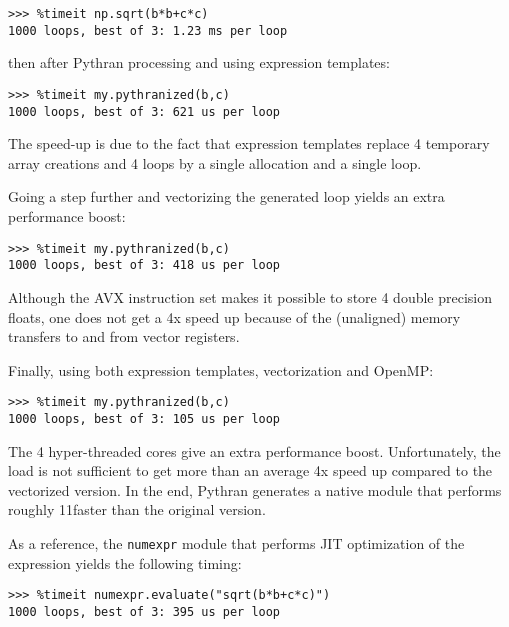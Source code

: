 \documentclass[10pt, onecolumn, preprint]{sigplanconf}
\begin{document}
\begin{lstlisting}
>>> %timeit np.sqrt(b*b+c*c)
1000 loops, best of 3: 1.23 ms per loop
\end{lstlisting}

\noindent then after Pythran processing and using expression templates:

\begin{lstlisting}
>>> %timeit my.pythranized(b,c)
1000 loops, best of 3: 621 us per loop
\end{lstlisting}

The speed-up is due to the fact that expression templates replace 4 temporary
array creations and 4 loops by a single allocation and a single loop.

Going a step further and vectorizing the generated loop yields an extra
performance boost:

\begin{lstlisting}
>>> %timeit my.pythranized(b,c)
1000 loops, best of 3: 418 us per loop
\end{lstlisting}

Although the AVX instruction set makes it possible to store 4 double precision
floats, one does not get a 4x speed up because of the (unaligned) memory transfers
to and from vector registers.

Finally, using both expression templates, vectorization and OpenMP:

\begin{lstlisting}
>>> %timeit my.pythranized(b,c)
1000 loops, best of 3: 105 us per loop
\end{lstlisting}

The 4 hyper-threaded cores give an extra performance boost. Unfortunately, the
load is not sufficient to get more than an average 4x speed up compared to the
vectorized version.
In the end, Pythran generates a native module that performs
roughly 11\times faster than the original version.

As a reference, the \texttt{numexpr} module that performs JIT optimization of the
expression yields the following timing:

\begin{lstlisting}
>>> %timeit numexpr.evaluate("sqrt(b*b+c*c)")
1000 loops, best of 3: 395 us per loop
\end{lstlisting}
\end{document}
